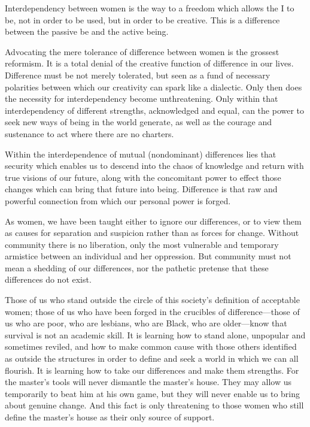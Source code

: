 \documentclass{article}
\begin{document}
Interdependency between women is the way to a freedom which allows the I to be, not in order to be used, but in order to be creative. This is a difference between the passive be and the active being. 

Advocating the mere tolerance of difference between women is the grossest reformism. It is a total denial of the creative function of difference in our lives. Difference must be not merely tolerated, but seen as a fund of necessary polarities between which our creativity can spark like a dialectic. Only then does the necessity for interdependency become unthreatening. Only within that interdependency of different strengths, acknowledged and equal, can the power to seek new ways of being in the world generate, as well as the courage and sustenance to act where there are no charters. 

Within the interdependence of mutual (nondominant) differences lies that security which enables us to descend into the chaos of knowledge and return with true visions of our future, along with the concomitant power to effect those changes which can bring that future into being. Difference is that raw and powerful connection from which our personal power is forged. 

As women, we have been taught either to ignore our differences, or to view them as causes for separation and suspicion rather than as forces for change. Without community there is no liberation, only the most vulnerable and temporary armistice between an individual and her oppression. But community must not mean a shedding of our differences, nor the pathetic pretense that these differences do not exist. 

Those of us who stand outside the circle of this society's definition of acceptable women; those of us who have been forged in the crucibles of difference—those of us who are poor, who are lesbians, who are Black, who are older—know that survival is not an academic skill. It is learning how to stand alone, unpopular and sometimes reviled, and how to make common cause with those others identified as outside the structures in order to define and seek a world in which we can all flourish. It is learning how to take our differences and make them strengths. For the master's tools will never dismantle the master's house. They may allow us temporarily to beat him at his own game, but they will never enable us to bring about genuine change. And this fact is only threatening to those women who still define the master's house as their only source of support. 
\end{document}
